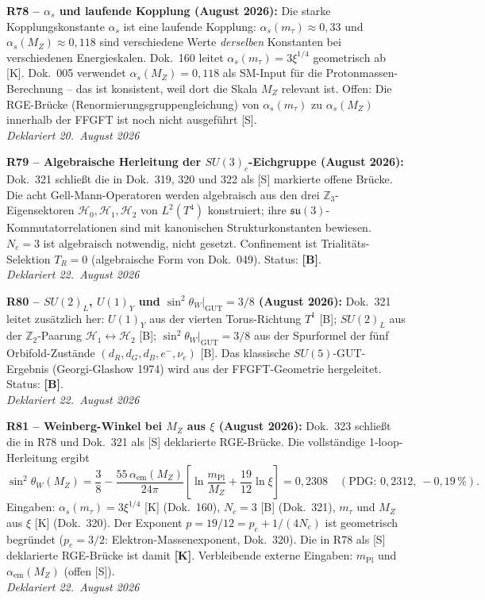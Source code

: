 \medskip
\textbf{R78 -- $\alpha_s$ und laufende Kopplung (August 2026):} Die starke Kopplungskonstante $\alpha_s$ ist eine laufende Kopplung: $\alpha_s(m_\tau) \approx 0{,}33$ und $\alpha_s(M_Z) \approx 0{,}118$ sind verschiedene Werte \emph{derselben} Konstanten bei verschiedenen Energieskalen. Dok.~160 leitet $\alpha_s(m_\tau) = 3\xi^{1/4}$ geometrisch ab [K]. Dok.~005 verwendet $\alpha_s(M_Z) = 0{,}118$ als SM-Input für die Protonmassen-Berechnung -- das ist konsistent, weil dort die Skala $M_Z$ relevant ist. Offen: Die RGE-Brücke (Renormierungsgruppengleichung) von $\alpha_s(m_\tau)$ zu $\alpha_s(M_Z)$ innerhalb der FFGFT ist noch nicht ausgeführt [S].\\
\emph{Deklariert 20.~August 2026}

\medskip

\medskip
\textbf{R79 -- Algebraische Herleitung der $SU(3)_c$-Eichgruppe (August 2026):} Dok.~321 schließt die in Dok.~319, 320 und 322 als [S] markierte offene Brücke. Die acht Gell-Mann-Operatoren werden algebraisch aus den drei $\mathbb{Z}_3$-Eigensektoren $\mathcal{H}_0, \mathcal{H}_1, \mathcal{H}_2$ von $L^2(T^4)$ konstruiert; ihre $\mathfrak{su}(3)$-Kommutatorrelationen sind mit kanonischen Strukturkonstanten bewiesen. $N_c = 3$ ist algebraisch notwendig, nicht gesetzt. Confinement ist Trialitäts-Selektion $T_R = 0$ (algebraische Form von Dok.~049). Status: \textbf{[B]}.\\
\emph{Deklariert 22.~August 2026}

\medskip
\textbf{R80 -- $SU(2)_L$, $U(1)_Y$ und $\sin^2\theta_W|_{\mathrm{GUT}} = 3/8$ (August 2026):} Dok.~321 leitet zusätzlich her: $U(1)_Y$ aus der vierten Torus-Richtung $T^1$ [B]; $SU(2)_L$ aus der $\mathbb{Z}_2$-Paarung $\mathcal{H}_1\leftrightarrow\mathcal{H}_2$ [B]; $\sin^2\theta_W|_{\mathrm{GUT}} = 3/8$ aus der Spurformel der fünf Orbifold-Zustände $(d_R,d_G,d_B,e^-,\nu_e)$ [B]. Das klassische $SU(5)$-GUT-Ergebnis (Georgi-Glashow 1974) wird aus der FFGFT-Geometrie hergeleitet. Status: \textbf{[B]}.\\
\emph{Deklariert 22.~August 2026}

\medskip
\textbf{R81 -- Weinberg-Winkel bei $M_Z$ aus $\xi$ (August 2026):} Dok.~323 schließt die in R78 und Dok.~321 als [S] deklarierte RGE-Brücke. Die vollständige 1-loop-Herleitung ergibt
\[
  \sin^2\theta_W(M_Z) = \frac{3}{8}
  - \frac{55\,\alpha_{\mathrm{em}}(M_Z)}{24\pi}
    \!\left[\ln\!\frac{m_{\mathrm{Pl}}}{M_Z}
           + \frac{19}{12}\ln\xi\right]
  = 0{,}2308
  \quad(\text{PDG: }0{,}2312{,}\ -0{,}19\,\%).
\]
Eingaben: $\alpha_s(m_\tau) = 3\xi^{1/4}$ [K] (Dok.~160), $N_c = 3$ [B] (Dok.~321), $m_\tau$ und $M_Z$ aus $\xi$ [K] (Dok.~320). Der Exponent $p = 19/12 = p_e + 1/(4N_c)$ ist geometrisch begründet ($p_e = 3/2$: Elektron-Massenexponent, Dok.~320). Die in R78 als [S] deklarierte RGE-Brücke ist damit \textbf{[K]}. Verbleibende externe Eingaben: $m_{\mathrm{Pl}}$ und $\alpha_{\mathrm{em}}(M_Z)$ (offen [S]).\\
\emph{Deklariert 22.~August 2026}


